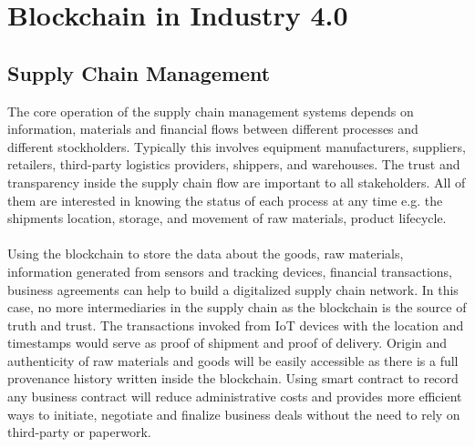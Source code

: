 \documentclass[runningheads]{llncs}
\begin{document}
\section{Blockchain in Industry 4.0 \cite{Mohamed2019,Internet2019}}

\subsection{Supply Chain Management}
The core operation of the supply chain management systems depends on information, materials and financial flows between different processes and different stockholders. Typically this involves equipment manufacturers, suppliers, retailers, third-party logistics providers, shippers, and warehouses. The trust and transparency inside the supply chain flow are important to all stakeholders. All of them are interested in knowing the status of each process at any time e.g. the shipments location, storage, and movement of raw materials, product lifecycle. 

\paragraph{}

Using the blockchain to store the data about the goods, raw materials, information generated from sensors and tracking devices, financial transactions, business agreements can help to build a digitalized supply chain network. In this case, no more intermediaries in the supply chain as the blockchain is the source of truth and trust. The transactions invoked from IoT devices with the location and timestamps would serve as proof of shipment and proof of delivery. Origin and authenticity of raw materials and goods will be easily accessible as there is a full provenance history written inside the blockchain. Using smart contract to record any business contract will reduce administrative costs and provides more efficient ways to initiate, negotiate and finalize business deals without the need to rely on third-party or paperwork.
\end{document}
